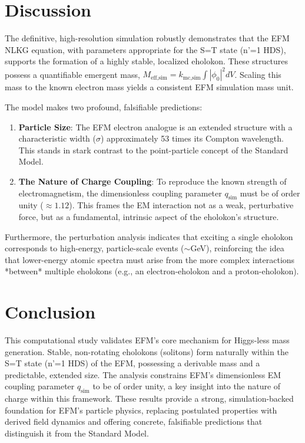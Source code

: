 \documentclass[11pt]{article}
\begin{document}
\section{Discussion}
The definitive, high-resolution simulation robustly demonstrates that the EFM NLKG equation, with parameters appropriate for the S=T state (n'=1 HDS), supports the formation of a highly stable, localized eholokon. These structures possess a quantifiable emergent mass, \(M_{\text{eff,sim}} = k_{\text{mc,sim}} \int |\phi_0|^2 dV\). Scaling this mass to the known electron mass yields a consistent EFM simulation mass unit.

The model makes two profound, falsifiable predictions:
\begin{enumerate}
    \item \textbf{Particle Size}: The EFM electron analogue is an extended structure with a characteristic width (\(\sigma\)) approximately 53 times its Compton wavelength. This stands in stark contrast to the point-particle concept of the Standard Model.
    \item \textbf{The Nature of Charge Coupling}: To reproduce the known strength of electromagnetism, the dimensionless coupling parameter \(q_{\text{sim}}\) must be of order unity (\(\approx 1.12\)). This frames the EM interaction not as a weak, perturbative force, but as a fundamental, intrinsic aspect of the eholokon's structure.
\end{enumerate}
Furthermore, the perturbation analysis indicates that exciting a single eholokon corresponds to high-energy, particle-scale events (\(\sim\)GeV), reinforcing the idea that lower-energy atomic spectra must arise from the more complex interactions *between* multiple eholokons (e.g., an electron-eholokon and a proton-eholokon).

\section{Conclusion}
This computational study validates EFM's core mechanism for Higgs-less mass generation. Stable, non-rotating eholokons (solitons) form naturally within the S=T state (n'=1 HDS) of the EFM, possessing a derivable mass and a predictable, extended size. The analysis constrains EFM's dimensionless EM coupling parameter \(q_{\text{sim}}\) to be of order unity, a key insight into the nature of charge within this framework. These results provide a strong, simulation-backed foundation for EFM's particle physics, replacing postulated properties with derived field dynamics and offering concrete, falsifiable predictions that distinguish it from the Standard Model.
\end{document}
